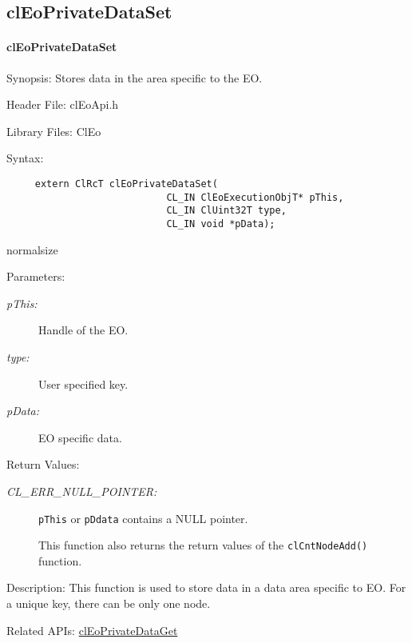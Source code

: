 \begin{flushleft}
\subsection{clEoPrivateDataSet}
\hypertarget{pageeo112}{}\paragraph{cl\-Eo\-Private\-Data\-Set}\label{pageeo112}
\begin{Desc}
\item[Synopsis:]Stores data in the area specific to the EO.\end{Desc}
\begin{Desc}
\item[Header File:]clEoApi.h\end{Desc}
\begin{Desc}
\item[Library Files:]Cl\-Eo\end{Desc}
\begin{Desc}
\item[Syntax:]

\footnotesize\begin{verbatim}     extern ClRcT clEoPrivateDataSet(
                 			CL_IN ClEoExecutionObjT* pThis,
                 			CL_IN ClUint32T type,
                 			CL_IN void *pData);
\end{verbatim}
  normalsize
\end{Desc}
\begin{Desc}
\item[Parameters:]
\begin{description}
\item[{\em p\-This:}]Handle of the EO. 
\item[{\em type:}]User specified key. 
\item[{\em p\-Data:}]EO specific data.
\end{description}
\end{Desc}

\begin{Desc}
\item[Return Values:]
\begin{description}
\item[{\em CL\_\-ERR\_\-NULL\_\-POINTER:}] {\tt{pThis}} or {\tt{pDdata}} contains a NULL pointer.
 \par
 This function also returns the return values of the {\tt{cl\-Cnt\-Node\-Add()}} function.
 \end{description}
\end{Desc}
\begin{Desc}
\item[Description:]This function is used to store data in a data area specific to EO. For a unique key, there can be only one node.\end{Desc}
\begin{Desc}
\item[Related APIs:]\hyperlink{pageeo109}{cl\-Eo\-Private\-Data\-Get} \end{Desc}





\end{flushleft}
